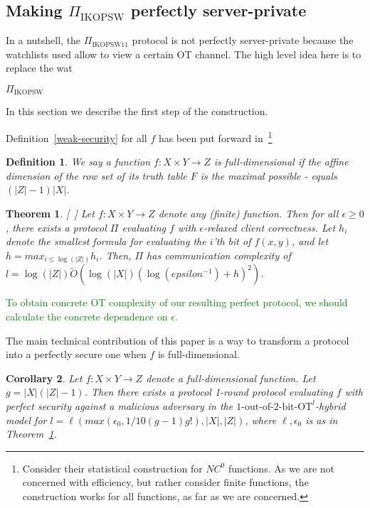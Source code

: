 \documentclass[a4paper]{article}
\newtheorem{definition}{Definition}[section]
\newtheorem{theorem}{Theorem}[section]
\newtheorem{corollary}[theorem]{Corollary}
\newcommand{\OT}[2]{#1\text{-out-of-}#2\text{-bit-OT}}
\newcommand{\atodo}[1]{\textcolor{green}{#1}}
\begin{document}
\subsection{Making $\Pi_{\text{IKOPSW}}$ perfectly server-private}

In a nutshell, the $\Pi_{\text{IKOPSW11}}$ protocol is not perfectly server-private because the watchlists used allow to view a certain OT channel.
The high level idea here is to replace the wat

$\Pi_{\text{IKOPSW}}$

In this section we describe the first step of the construction.

Definition~\ref{weak-security} for all $f$ has been put forward in~\cite{IKOPS}\footnote{Consider their statistical construction for $NC^0$ functions. As we are not concerned with efficiency, but rather consider finite functions, the construction works for all functions, as far as we are concerned.}

\begin{definition}
	We say a function $f:X\times Y\rightarrow Z$ is full-dimensional if the affine dimension of the row set of its truth table $F$ is the maximal possible - equals $(|Z|-1)|X|$.
\end{definition}

\begin{theorem}\label{thm-IVWD}[~\cite{}]
Let $f:X\times Y\rightarrow Z$ denote any (finite) function.
Then for all $\epsilon \geq 0$, there exists a protocol $\Pi$ evaluating $f$ with $\epsilon$-relaxed client correctness. 
Let $h_i$ denote the smallest formula for evaluating the $i$'th bit of $f(x,y)$, and let $h = max_{i\leq \log(|Z|)} h_i$.
Then, $\Pi$ has communication complexity of $l=\log(|Z|)\tilde{O}(\log(|X|) (\log({epsilon^{-1}})+h)^2)$.

\end{theorem}

\atodo{To obtain concrete OT complexity of our resulting perfect protocol, we should calculate the concrete dependence on $\epsilon$.} 

The main technical contribution of this paper is a way to transform a protocol into a perfectly secure one when $f$ is full-dimensional. 
\begin{corollary}
Let $f:X\times Y\rightarrow Z$ denote a full-dimensional function.
Let $g=|X|(|Z|-1)$.
Then there exists a protocol 1-round protocol evaluating $f$ with perfect security against a malicious adversary in the ${\OT{1}{2}}^l$-hybrid model
for $l=\ell(max(\epsilon_0,1/10(g-1)g!), |X|, |Z|)$, where $\ell,\epsilon_0$ is as in Theorem~\ref{thm-IVWD}.

\end{corollary}
\end{document}
